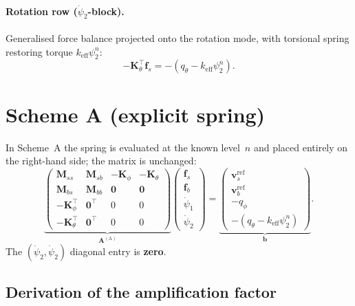 \documentclass[11pt]{article}
\newcommand{\keff}{k_\mathrm{eff}}
\newcommand{\Kth}{\mathbf{K}_\theta}
\newcommand{\Mss}{\mathbf{M}_{ss}}
\begin{document}
\paragraph{Rotation row ($\dot\psi_2$-block).}
Generalised force balance projected onto the rotation mode, with
torsional spring restoring torque $\keff\psi_2^n$:
\[
  -\Kth^\top\mathbf{f}_s = -(q_\theta - \keff\psi_2^n).
\]

\section{Scheme A (explicit spring)}

In Scheme~A the spring is evaluated at the known level~$n$ and placed
entirely on the right-hand side; the matrix is unchanged:
%
\begin{equation}\label{eq:schemeA}
\underbrace{
\begin{pmatrix}
  \Mss & \mathbf{M}_{sb} & -\mathbf{K}_\phi & -\Kth \\[3pt]
  \mathbf{M}_{bs} & \mathbf{M}_{bb} & \mathbf{0} & \mathbf{0} \\[3pt]
  -\mathbf{K}_\phi^\top & \mathbf{0}^\top & 0 & 0 \\[3pt]
  -\Kth^\top & \mathbf{0}^\top & 0 & 0
\end{pmatrix}
}_{\mathbf{A}^{(\mathrm{A})}}
\begin{pmatrix}\mathbf{f}_s\\\mathbf{f}_b\\\dot\psi_1\\\dot\psi_2\end{pmatrix}
=
\underbrace{
\begin{pmatrix}
  \mathbf{v}_s^\mathrm{ref}\\[3pt]
  \mathbf{v}_b^\mathrm{ref}\\[3pt]
  -q_\phi\\[3pt]
  -(q_\theta-\keff\psi_2^n)
\end{pmatrix}
}_{\mathbf{b}}.
\end{equation}
%
The $(\dot\psi_2,\dot\psi_2)$ diagonal entry is \textbf{zero}.

\subsection*{Derivation of the amplification factor}
\end{document}
